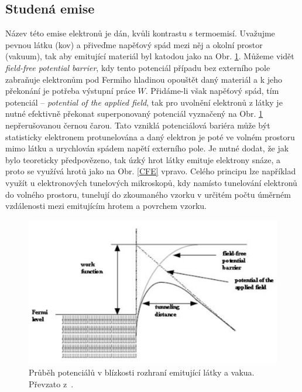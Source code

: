 \subsection{Studená emise} Název této emise elektronů je dán, kvůli kontrastu s termoemisí. Uvažujme pevnou látku (kov) a přiveďme napěťový spád mezi něj a okolní prostor (vakuum), tak aby emitující materiál byl katodou jako na Obr. \ref{CFEpotent}. Můžeme vidět \textit{field-free potential barrier}, kdy tento potenciál případu bez externího pole zabraňuje elektronům pod Fermiho hladinou opouštět daný materiál a k jeho překonání je potřeba výstupní práce $W$. Přidáme-li však napěťový spád, tím potenciál -- \textit{potential of the applied field}, tak pro uvolnění elektronů z látky je nutné efektivně překonat superponovaný potenciál vyznačený na Obr. \ref{CFEpotent} nepřerušovanou černou čarou. Tato vzniklá potenciálová bariéra může být statisticky elektronem protunelována a daný elektron je poté ve volném prostoru mimo látku a urychlován spádem napětí externího pole. Je nutné dodat, že jak bylo teoreticky předpovězeno, tak úzký hrot látky emituje elektrony snáze, a proto se využívá hrotů jako na Obr. \ref{CFE} vpravo. Celého principu lze například využít u elektronových tunelových mikroskopů, kdy namísto tunelování elektronů do volného prostoru, tunelují do zkoumaného vzorku v určitém počtu úměrném vzdálenosti mezi emitujícím hrotem a povrchem vzorku. 

\begin{figure}[htbp!]
	\centering
	\includegraphics[width = 350 pt]{CFEpotent.png}
	\caption{Průběh potenciálů v blízkosti rozhraní emitující látky a vakua. Převzato z~\cite{coldems}.}
	\label{CFEpotent}
\end{figure}

